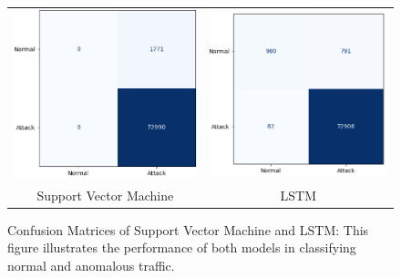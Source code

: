 \documentclass[preprint,12pt,authoryear]{elsarticle}
\begin{document}
\begin{figure}[H]
    \centering
    \begin{tabular}{cc}
        \includegraphics[width=0.5\linewidth]{support vector Machine.png} &
        \includegraphics[width=0.5\linewidth]{LSTM.png} \\
        \small Support Vector Machine & \small LSTM
    \end{tabular}
    \caption{Confusion Matrices of Support Vector Machine and LSTM:
This figure illustrates the performance of both models in classifying normal and anomalous traffic.}
    \label{fig:confusion_matrices_svm_lstm}
\end{figure}
\end{document}
